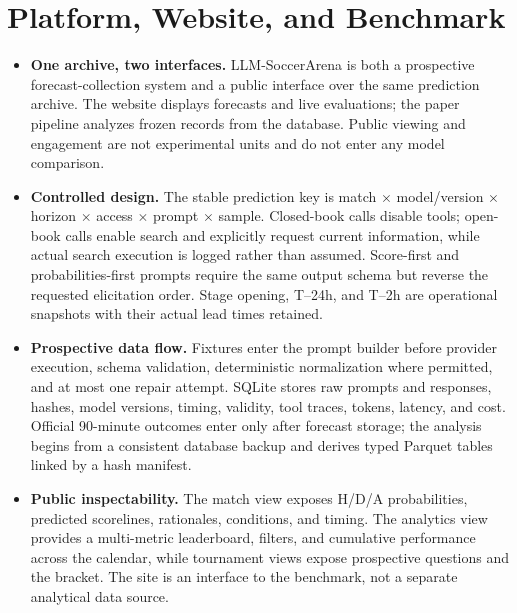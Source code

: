 \documentclass[sigconf,review]{acmart}
\newcommand{\arena}{\mbox{LLM-SoccerArena}\xspace}
\newenvironment{draftbullets}
  {\begin{itemize}[leftmargin=1.25em,itemsep=1.5pt,topsep=2pt,parsep=0pt,partopsep=0pt]}
  {\end{itemize}}
\begin{document}
\section{Platform, Website, and Benchmark}
\label{sec:benchmark}

\begin{draftbullets}
  \item \textbf{One archive, two interfaces.} \arena is both a prospective forecast-collection system
  and a public interface over the same prediction archive. The website displays forecasts and live
  evaluations; the paper pipeline analyzes frozen records from the database. Public viewing and
  engagement are not experimental units and do not enter any model comparison.

  \item \textbf{Controlled design.} The stable prediction key is match $\times$ model/version $\times$
  horizon $\times$ access $\times$ prompt $\times$ sample. Closed-book calls disable tools; open-book
  calls enable search and explicitly request current information, while actual search execution is
  logged rather than assumed. Score-first and probabilities-first prompts require the same output
  schema but reverse the requested elicitation order. Stage opening, T--24h, and T--2h are operational
  snapshots with their actual lead times retained.

  \item \textbf{Prospective data flow.} Fixtures enter the prompt builder before provider execution,
  schema validation, deterministic normalization where permitted, and at most one repair attempt.
  SQLite stores raw prompts and responses, hashes, model versions, timing, validity, tool traces,
  tokens, latency, and cost. Official 90-minute outcomes enter only after forecast storage; the
  analysis begins from a consistent database backup and derives typed Parquet tables linked by a
  hash manifest.

  \item \textbf{Public inspectability.} The match view exposes H/D/A probabilities, predicted
  scorelines, rationales, conditions, and timing. The analytics view provides a multi-metric
  leaderboard, filters, and cumulative performance across the calendar, while tournament views expose
  prospective questions and the bracket. The site is an interface to the benchmark, not a separate
  analytical data source.
\end{draftbullets}
\end{document}
